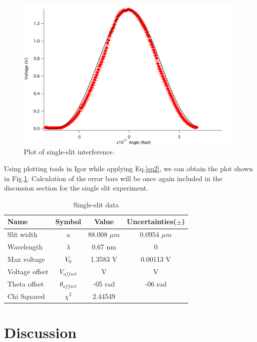 \documentclass[prb,preprint]{revtex4-1}
\begin{document}
\begin{figure}[h]
\centering
\includegraphics[width=6.6in]{single.png}
\caption{Plot of single-slit interference.}
\label{single}
\end{figure}

Using plotting tools in Igor while applying Eq.\ref{eq2}, we can obtain the plot shown in Fig.\ref{single}. Calculation of the error bars will be once again included in the discussion section for the single slit experiment.

\begin{table}[h]
\centering
\caption{Single-slit data}
\begin{ruledtabular}
\begin{tabular}{ l c c c}
Name & Symbol & Value & Uncertainties($\pm$)\\
\hline
Slit width & a & 88.008 $\mu m$ & 0.0954 $\mu m$\\
Wavelength & $\lambda$ & 0.67 nm & 0\\
Max voltage & $V_0$ & 1.3583 V & 0.00113 V\\
Voltage offset & $V_{offset}$ &  V &  V\\
Theta offset &$ \theta_{offset}$ & -05 rad & -06 rad \\

\hline
Chi Squared & $\chi^2$ & 2.44549&
\end{tabular}
\end{ruledtabular}
\label{data}
\end{table}

\section{Discussion}
\end{document}
